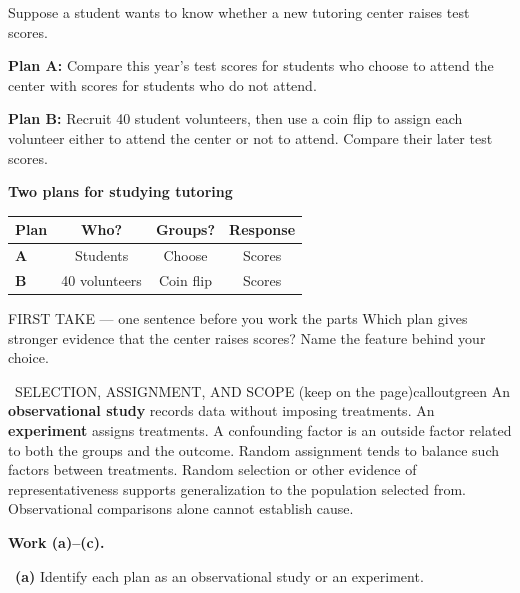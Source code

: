 \documentclass[11pt]{article}
\begin{document}


Suppose a student wants to know whether a new tutoring center raises test scores.\par\smallskip \textbf{Plan A:} Compare this year's test scores for students who choose to attend the center with scores for students who do not attend.\par \textbf{Plan B:} Recruit 40 student volunteers, then use a coin flip to assign each volunteer either to attend the center or not to attend. Compare their later test scores.\par
\begin{center}
\textbf{Two plans for studying tutoring}\par\smallskip
\begin{tabular}{|l|c|c|c|}
\hline
\textbf{Plan} & \textbf{Who?} & \textbf{Groups?} & \textbf{Response} \\ \hline
\textbf{A} & Students & Choose & Scores \\ \hline
\textbf{B} & 40 volunteers & Coin flip & Scores \\ \hline
\end{tabular}
\end{center}
\begin{firsttakebox}{FIRST TAKE --- one sentence before you work the parts}
Which plan gives stronger evidence that the center raises scores? Name the feature behind your choice.
\workspace{0.9in}
\end{firsttakebox}

\begin{callout}{\IconBook\ SELECTION, ASSIGNMENT, AND SCOPE (keep on the page)}{calloutgreen}
An \textbf{observational study} records data without imposing treatments. An \textbf{experiment} assigns treatments. A confounding factor is an outside factor related to both the groups and the outcome. Random assignment tends to balance such factors between treatments. Random selection or other evidence of representativeness supports generalization to the population selected from. Observational comparisons alone cannot establish cause.
\end{callout}

\newpage
\textbf{Work (a)--(c).}\par\smallskip

~\textbf{(a)} Identify each plan as an observational study or an experiment.\par
\workspace{0.8in}
\end{document}
